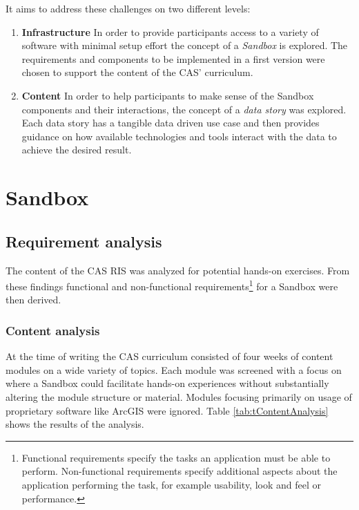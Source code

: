 \documentclass[11pt, a4paper, oneside, parskip=full-]{scrartcl}
\begin{document}
It aims to address these challenges on two different levels:
\begin{enumerate}
  \item \textbf{Infrastructure} In order to provide participants access to a
  variety of software with minimal setup effort the concept of a \emph{Sandbox}
  is explored. The requirements and components to be implemented in a first
  version were chosen to support the content of the CAS' curriculum.
  \item \textbf{Content} In order to help participants to make sense of the
  Sandbox components and their interactions, the concept of a \emph{data story}
  was explored. Each data story has a tangible data driven use case and then
  provides guidance on how available technologies and tools interact with the
  data to achieve the desired result.
\end{enumerate}

\section{Sandbox}

\subsection{Requirement analysis} \label{sectionrequirements}

The content of the CAS RIS was analyzed for potential hands-on exercises. From
these findings functional and non-functional requirements\footnote{Functional
requirements specify the tasks an application must be able to perform.
Non-functional requirements specify additional aspects about the application
performing the task, for example usability, look and feel or performance. } for
a Sandbox were then derived.

\subsubsection{Content analysis}
At the time of writing the CAS curriculum consisted of four weeks of content
modules on a wide variety of topics. Each module was screened with a focus on
where a Sandbox could facilitate hands-on experiences without substantially
altering the module structure or material. Modules focusing primarily on usage
of proprietary software like ArcGIS were ignored. Table
\ref{tab:tContentAnalysis} shows the results of the analysis.
\end{document}

